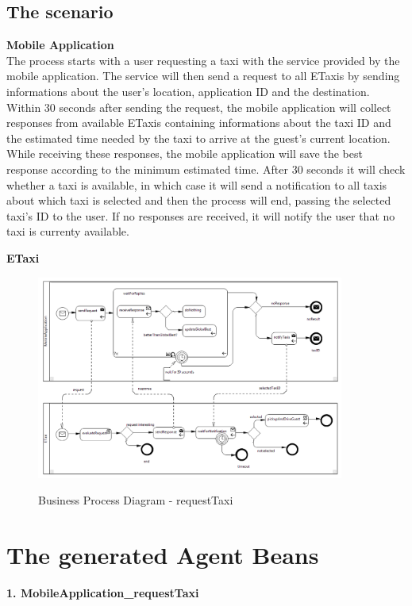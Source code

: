 \newpage
\subsection{The scenario}
\textbf{Mobile Application}\\
The process starts with a user requesting a taxi with the service provided by the mobile application. The service will then send a request to all ETaxis by sending informations about the user's location, application ID and the destination. Within 30 seconds after sending the request, the mobile application will collect responses from available ETaxis containing informations about the taxi ID and the estimated time needed by the taxi to arrive at the guest's current location. While receiving these responses, the mobile application will save the best response according to the minimum estimated time. After 30 seconds it will check whether a taxi is available, in which case it will send a notification to all taxis about which taxi is selected and then the process will end, passing the selected taxi's ID to the user. If no responses are received, it will notify the user that no taxi is currenty available. 


\textbf{ETaxi}\\


\begin{figure}
	\centering
		\includegraphics[width = 0.9\textwidth]{images/example/requestTaxi.png}
	\label{fig:example}
	\caption{Business Process Diagram - requestTaxi}
\end{figure}

\newpage
\section{The generated Agent Beans}
\textbf{1. MobileApplication\_requestTaxi}\\

